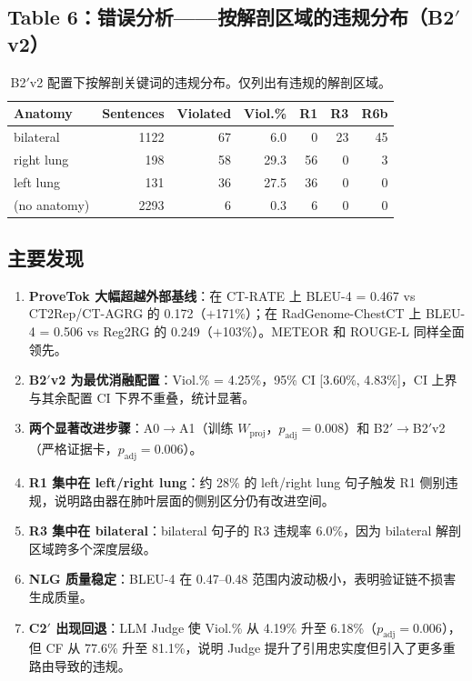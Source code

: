 \documentclass[11pt,a4paper]{article}
\theoremstyle{definition}
\begin{document}
\subsection{Table 6：错误分析——按解剖区域的违规分布（B2$'$v2）}

\begin{table}[H]
\centering
\caption{B2$'$v2 配置下按解剖关键词的违规分布。仅列出有违规的解剖区域。}\label{tab:anatomy_viol}
\small
\begin{tabular}{@{}l r r r r r r@{}}
\toprule
\textbf{Anatomy} & \textbf{Sentences} & \textbf{Violated} & \textbf{Viol.\%} & \textbf{R1} & \textbf{R3} & \textbf{R6b} \\
\midrule
bilateral    & 1122 & 67 &  6.0 &  0 & 23 & 45 \\
right lung   &  198 & 58 & 29.3 & 56 &  0 &  3 \\
left lung    &  131 & 36 & 27.5 & 36 &  0 &  0 \\
(no anatomy) & 2293 &  6 &  0.3 &  6 &  0 &  0 \\
\bottomrule
\end{tabular}
\end{table}

\subsection{主要发现}

\begin{enumerate}[nosep]
    \item \textbf{ProveTok 大幅超越外部基线}：在 CT-RATE 上 BLEU-4 = 0.467 vs CT2Rep/CT-AGRG 的 0.172（$+$171\%）；在 RadGenome-ChestCT 上 BLEU-4 = 0.506 vs Reg2RG 的 0.249（$+$103\%）。METEOR 和 ROUGE-L 同样全面领先。
    \item \textbf{B2$'$v2 为最优消融配置}：Viol.\% = 4.25\%，95\% CI [3.60\%, 4.83\%]，CI 上界与其余配置 CI 下界不重叠，统计显著。
    \item \textbf{两个显著改进步骤}：A0$\to$A1（训练 $W_{\mathrm{proj}}$，$p_{\mathrm{adj}}=0.008$）和 B2$'$$\to$B2$'$v2（严格证据卡，$p_{\mathrm{adj}}=0.006$）。
    \item \textbf{R1 集中在 left/right lung}：约 28\% 的 left/right lung 句子触发 R1 侧别违规，说明路由器在肺叶层面的侧别区分仍有改进空间。
    \item \textbf{R3 集中在 bilateral}：bilateral 句子的 R3 违规率 6.0\%，因为 bilateral 解剖区域跨多个深度层级。
    \item \textbf{NLG 质量稳定}：BLEU-4 在 0.47--0.48 范围内波动极小，表明验证链不损害生成质量。
    \item \textbf{C2$'$ 出现回退}：LLM Judge 使 Viol.\% 从 4.19\% 升至 6.18\%（$p_{\mathrm{adj}}=0.006$），但 CF 从 77.6\% 升至 81.1\%，说明 Judge 提升了引用忠实度但引入了更多重路由导致的违规。
\end{enumerate}
\end{document}
